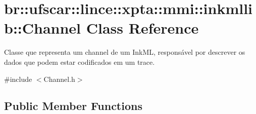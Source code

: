 \hypertarget{classbr_1_1ufscar_1_1lince_1_1xpta_1_1mmi_1_1inkmllib_1_1Channel}{
\section{br::ufscar::lince::xpta::mmi::inkmllib::Channel Class Reference}
\label{classbr_1_1ufscar_1_1lince_1_1xpta_1_1mmi_1_1inkmllib_1_1Channel}
}


Classe que representa um channel de um InkML, responsável por descrever os dados que podem estar codificados em um trace.  




{\ttfamily \#include $<$Channel.h$>$}

\subsection*{Public Member Functions}
